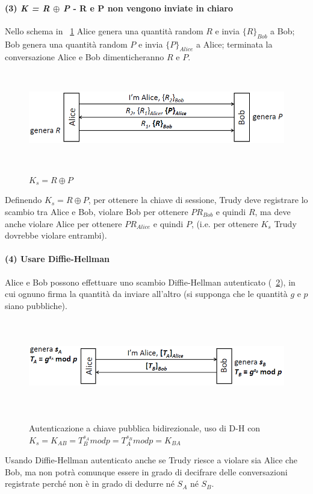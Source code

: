 \paragraph{(3) \textit{K = R $\oplus$ P}  - R e P non vengono inviate in chiaro}
Nello schema in \figurename~\ref{fig:ImgS74bis} Alice genera una quantità random $R$ e invia $\lbrace R\rbrace_{Bob}$ a Bob; Bob genera una quantità random $P$ e invia $\lbrace P\rbrace_{Alice}$ a Alice; terminata la conversazione Alice e Bob dimenticheranno $R$ e $P$.
\begin{figure}[htbp]
	\centering%
	\subfigure%
	{\includegraphics[height=4cm, width=12cm, keepaspectratio]{Immagini/autenticazione/ImgS74bis.png}}
	\caption{$K_{s} = R \oplus P$}\label{fig:ImgS74bis} 	
\end{figure}
Definendo $K_{s} = R \oplus P$, per ottenere la chiave di sessione, Trudy deve registrare lo scambio tra Alice e Bob,  violare Bob per ottenere $PR_{Bob}$ e quindi $R$, ma deve anche violare Alice per ottenere $PR_{Alice}$ e quindi $P$, (i.e. per ottenere $K_{s}$ Trudy dovrebbe violare entrambi).
\paragraph{(4) Usare Diffie-Hellman}
Alice e Bob possono effettuare uno scambio Diffie-Hellman autenticato (\figurename~\ref{fig:ImgS77bis}), in cui ognuno firma la quantità da inviare all'altro (si supponga che le quantità $g$ e $p$ siano pubbliche).
\begin{figure}[htbp]
	\centering%
	\subfigure%
	{\includegraphics[height=4cm, width=12cm, keepaspectratio]{Immagini/autenticazione/ImgS77bis.png}}
	\caption{Autenticazione a chiave pubblica bidirezionale, uso di D-H con $K_{s} = K_{AB} = T_{B}^{s_{A}}modp = T_{A}^{s_{B}}modp = K_{BA}$}\label{fig:ImgS77bis} 	
\end{figure}
Usando Diffie-Hellman autenticato anche se Trudy riesce a violare sia Alice che Bob, ma non potrà comunque essere in grado di decifrare delle conversazioni registrate perché non è in grado di dedurre né $S_{A}$ né $S_{B}$.
